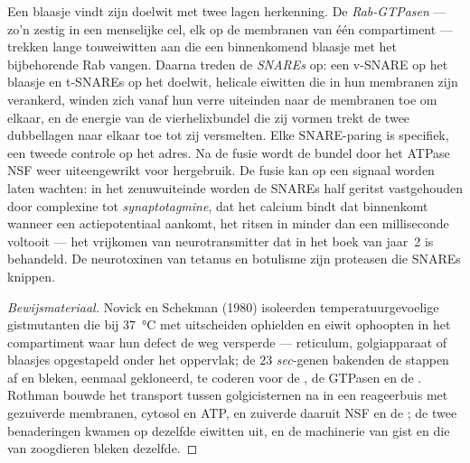 \begin{definition}\label{def:b3:membrane-traffic:fusion}
Een blaasje vindt zijn doelwit met twee lagen herkenning. De
\emph{Rab-GTPasen} --- zo'n zestig in een menselijke cel, elk op de
membranen van één compartiment --- trekken lange touweiwitten aan die
een binnenkomend blaasje met het bijbehorende Rab vangen. Daarna
treden de \emph{SNAREs} op: een v-SNARE op het blaasje en t-SNAREs op
het doelwit, helicale eiwitten die in hun membranen zijn verankerd,
winden zich vanaf hun verre uiteinden naar de membranen toe om elkaar,
en de energie van de vierhelixbundel die zij vormen trekt de twee
dubbellagen naar elkaar toe tot zij versmelten. Elke SNARE-paring is
specifiek, een tweede controle op het adres. Na de fusie wordt de
bundel door het ATPase NSF weer uiteengewrikt voor hergebruik. De fusie
kan op een signaal worden laten wachten: in het zenuwuiteinde worden de
SNAREs half geritst vastgehouden door complexine tot
\emph{synaptotagmine}, dat het calcium bindt dat binnenkomt wanneer een
actiepotentiaal aankomt, het ritsen in minder dan een milliseconde
voltooit --- het vrijkomen van neurotransmitter dat in het boek van
jaar~2 is behandeld. De neurotoxinen van tetanus en botulisme zijn
proteasen die SNAREs knippen.
\end{definition}

\begin{proof}[Bewijsmateriaal]
Novick en Schekman (1980) isoleerden temperatuurgevoelige gistmutanten
die bij \qty{37}{\celsius} met uitscheiden ophielden en eiwit ophoopten
in het compartiment waar hun defect de weg versperde --- reticulum,
golgiapparaat of blaasjes opgestapeld onder het oppervlak; de $23$
\emph{sec}-genen bakenden de stappen af en bleken, eenmaal gekloneerd,
te coderen voor de , de GTPasen en de . Rothman bouwde
het transport tussen golgicisternen na in een reageerbuis met
gezuiverde membranen, cytosol en ATP, en zuiverde daaruit NSF en de
; de twee benaderingen kwamen op dezelfde eiwitten uit, en de
machinerie van gist en die van zoogdieren bleken dezelfde.
\end{proof}

